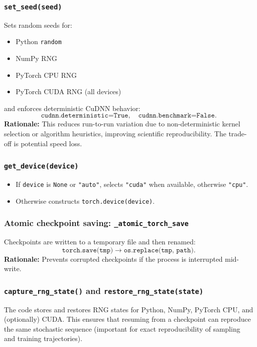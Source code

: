 \subsubsection*{\texttt{set\_seed(seed)}}
Sets random seeds for:
\begin{itemize}
  \item Python \texttt{random}
  \item NumPy RNG
  \item PyTorch CPU RNG
  \item PyTorch CUDA RNG (all devices)
\end{itemize}
and enforces deterministic CuDNN behavior:
\[
\texttt{cudnn.deterministic=True},\quad \texttt{cudnn.benchmark=False}.
\]
\textbf{Rationale:} This reduces run-to-run variation due to non-deterministic kernel selection or algorithm heuristics, improving scientific reproducibility. The trade-off is potential speed loss.

\subsubsection*{\texttt{get\_device(device)}}
\begin{itemize}
  \item If \texttt{device} is \texttt{None} or \texttt{"auto"}, selects \texttt{"cuda"} when available, otherwise \texttt{"cpu"}.
  \item Otherwise constructs \texttt{torch.device(device)}.
\end{itemize}

\subsubsection*{Atomic checkpoint saving: \texttt{\_atomic\_torch\_save}}
Checkpoints are written to a temporary file and then renamed:
\[
\texttt{torch.save(tmp)} \rightarrow \texttt{os.replace(tmp, path)}.
\]
\textbf{Rationale:} Prevents corrupted checkpoints if the process is interrupted mid-write.

\subsubsection*{\texttt{capture\_rng\_state()} and \texttt{restore\_rng\_state(state)}}
The code stores and restores RNG states for Python, NumPy, PyTorch CPU, and (optionally) CUDA. This ensures that resuming from a checkpoint can reproduce the same stochastic sequence (important for exact reproducibility of sampling and training trajectories).

